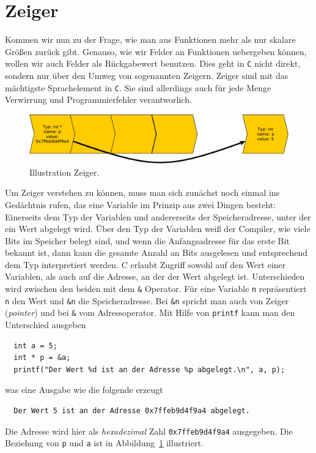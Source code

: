 
\section{Zeiger}

Kommen wir nun zu der Frage, wie man aus Funktionen mehr als nur skalare Größen zurück gibt.
Genauso, wie wir Felder an Funktionen uebergeben können, wollen wir auch Felder als Rückgabewert benutzen.
Dies geht in \texttt{C} nicht direkt, sondern nur über den Umweg von sogenannten Zeigern.
Zeiger sind mit das mächtigste Sprachelement in \texttt{C}.
Sie sind allerdings auch für jede Menge Verwirrung und Programmierfehler verantworlich.

\begin{figure}[h]
  \centering
  \includegraphics[width=\linewidth]{pointer-crop}
  \caption{\label{pointfig} Illustration Zeiger.}
\end{figure}


Um Zeiger verstehen zu können, muss man sich zunächst noch einmal ins Gedächtnis rufen, das eine Variable im Prinzip aus zwei Dingen besteht:
Einerseits dem Typ der Variablen und andererseits der Speicheradresse, unter der ein Wert abgelegt wird.
Über den Typ der Variablen weiß der Compiler, wie viele Bits im Speicher belegt sind, und wenn die Anfangsadresse für das erste Bit bekannt ist, dann kann die gesamte Anzahl an Bits ausgelesen und entsprechend dem Typ interpretiert werden.
C erlaubt Zugriff sowohl auf den Wert einer Variablen, als auch auf die Adresse, an der der Wert abgelegt ist.
Unterschieden wird zwischen den beiden mit dem \verb|&| Operator.
Für eine Variable \verb|n| repräsentiert \verb|n| den Wert und \verb|&n| die Speicheradresse.
Bei \verb|&n| spricht man auch von Zeiger (\emph{pointer}) und bei \verb|&| vom Adressoperator.\index{\&}
Mit Hilfe von \texttt{printf} kann man den Unterschied ausgeben
\begin{lstlisting}
  int a = 5;
  int * p = &a;
  printf("Der Wert %d ist an der Adresse %p abgelegt.\n", a, p);
\end{lstlisting}
was eine Ausgabe wie die folgende erzeugt
\begin{verbatim}
  Der Wert 5 ist an der Adresse 0x7ffeb9d4f9a4 abgelegt.
\end{verbatim}
Die Adresse wird hier als \emph{hexadezimal} Zahl \verb|0x7ffeb9d4f9a4| ausgegeben.
Die Beziehung von \verb|p| und \verb|a| ist in Abbildung~\ref{pointfig} illustriert.

